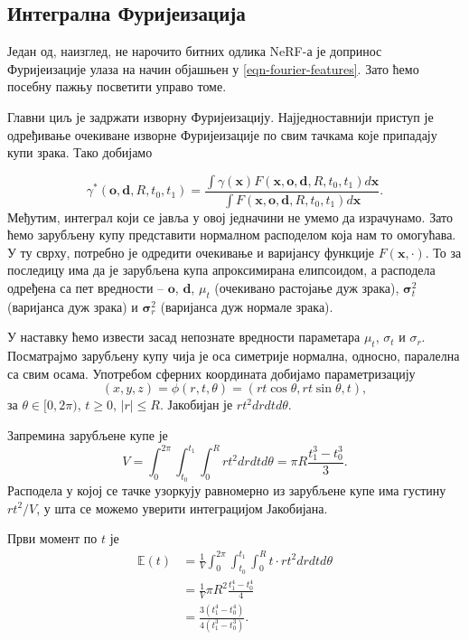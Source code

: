 \documentclass[12pt, a4paper, twoside]{book}
\numberwithin{equation}{chapter}
\numberwithin{theorem}{section}
\numberwithin{definition}{section}
\numberwithin{definitionChapter}{chapter}
\begin{document}
\subsection{Интегрална Фуријеизација}
Један од, наизглед, не нарочито битних одлика NeRF-а је допринос Фуријеизације улаза на начин
објашњен у \ref{eqn-fourier-features}. Зато ћемо посебну пажњу посветити управо томе.

Главни циљ је задржати изворну Фуријеизацију. Најједноставнији приступ је одређивање очекиване
изворне Фуријеизације по свим тачкама које припадају купи зрака. Тако добијамо

\begin{equation}
	\gamma^{*}(\mathbf{o}, \mathbf{d}, R, t_0, t_1)
		= \frac{\int\gamma(\mathbf{x})F(\mathbf{x}, \mathbf{o}, \mathbf{d}, R, t_0, t_1)d\mathbf{x}}
				{\int F(\mathbf{x}, \mathbf{o}, \mathbf{d}, R, t_0, t_1)d\mathbf{x}}.
	\label{eqn-ipe-raw}
\end{equation}
Међутим, интеграл који се јавља у овој једначини не умемо да израчунамо. Зато ћемо зарубљену купу
представити нормалном расподелом која нам то омогућава. У ту сврху, потребно је одредити
очекивање и варијансу функције $F(\mathbf{x}, \cdot)$. То за последицу има да је зарубљена купа
апроксимирана елипсоидом, а расподела одређена са пет вредности -- $\mathbf{o}$,
$\mathbf{d}$, $\mu_t$ (очекивано растојање дуж зрака), $\mathbf{\sigma}^2_t$ (варијанса дуж зрака) и
$\mathbf{\sigma}^2_r$ (варијанса дуж нормале зрака).

У наставку ћемо извести засад непознате вредности параметара $\mu_t$, $\sigma_t$ и $\sigma_r$.
Посматрајмо зарубљену купу чија је оса симетрије нормална, односно, паралелна са свим осама.
Употребом сферних координата добијамо параметризацију
\begin{equation}
	(x, y, z) = \phi(r, t, \theta) = (rt\cos\theta, rt\sin\theta, t),
\end{equation}
за $\theta \in [0, 2\pi)$, $t\geq 0$, $|r| \leq R$. Јакобијан је $rt^2drdtd\theta$.

Запремина зарубљене купе је
\begin{equation}
	V = \int_{0}^{2\pi}\int_{t_0}^{t_1}\int_{0}^{R}rt^2drdtd\theta = \pi R \frac{t_1^3 - t_0^3}{3}.
\end{equation}
Расподела у којој се тачке узоркују равномерно из зарубљене купе има густину $rt^2/V$, у шта се можемо
уверити интеграцијом Јакобијана.

Први момент по $t$ је
\begin{equation}
	\begin{split}
		\mathbb{E}(t) & = \frac{1}{V}\int_{0}^{2\pi}\int_{t_0}^{t_1}\int_{0}^{R}t \cdot rt^2drdtd\theta \\
			& = \frac{1}{V}\pi R^2 \frac{t_1^4 - t_0^4}{4} \\
			& = \frac{3(t_1^4 - t_0^4)}{4(t_1^3 - t_0^3)}.
	\end{split}
\end{equation}
\end{document}
